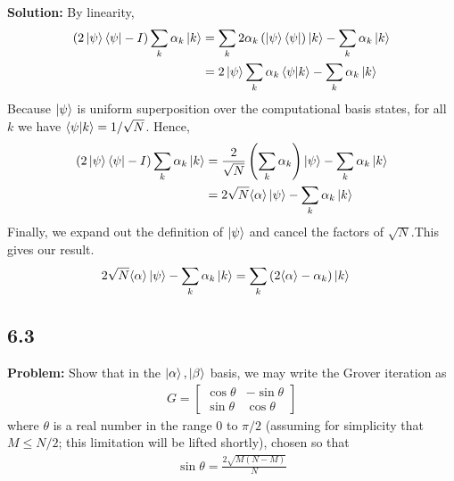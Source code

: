 \documentclass{article}
\begin{document}
\textbf{Solution:} By linearity,
\begin{align*}
    (2\ket{\psi}\bra{\psi}-I)\sum_k \alpha_k\ket{k} &= \sum_k 2 \alpha_k\left(\ket{\psi}\bra{\psi}\right)\ket{k} - \sum_k \alpha_k\ket{k} \\
    &= 2\ket{\psi}\sum_k\alpha_k\braket{\psi}{k}-\sum_k\alpha_k\ket{k}
\end{align*}
Because $\ket{\psi}$ is uniform superposition over the computational basis states, for all $k$ we have $\braket{\psi}{k}=1/\sqrt{N}$. Hence,
\begin{align}
(2\ket{\psi}\bra{\psi}-I)\sum_k \alpha_k\ket{k} &= \frac{2}{\sqrt{N}}\left(\sum_k\alpha_k\right)\ket{\psi} - \sum_k \alpha_k\ket{k} \\
&= 2\sqrt{N} \langle\alpha\rangle\ket{\psi} - \sum_k\alpha_k\ket{k}
\end{align}
Finally, we expand out the definition of $\ket{\psi}$ and cancel the factors of $\sqrt{N}$.This gives our result. 
\begin{align}
    2\sqrt{N} \langle\alpha\rangle\ket{\psi} - \sum_k\alpha_k\ket{k} &= \sum_k\left(2\langle\alpha\rangle-\alpha_k\right)\ket{k}
\end{align}

\subsection*{6.3}
\textbf{Problem:} Show that in the $\ket{\alpha}, \ket{\beta}$ basis, we may write the Grover iteration as
\begin{align}
    G = 
    \begin{bmatrix} \label{eq:matrix_G}
        \cos\theta & -\sin\theta \\
        \sin\theta & \cos\theta
    \end{bmatrix}
\end{align}
where $\theta$ is a real number in the range 0 to $\pi/2$ (assuming for simplicity that $M\leq N/2$; this limitation will be lifted shortly), chosen so that
\begin{align} \label{eq:theta_value}
    \sin\theta =\frac{2\sqrt{M(N-M)}}{N}
\end{align}
\end{document}
